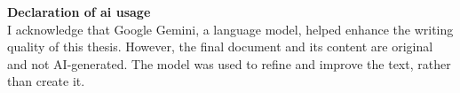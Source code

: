\listoffigures  %
\listoftables   %

\textbf{Declaration of \ac{ai} usage} \\
I acknowledge that Google Gemini, a language model, helped enhance the writing quality of this thesis. However, the final document and its content are original and not AI-generated. The model was used to refine and improve the text, rather than create it.


\clearpage  %